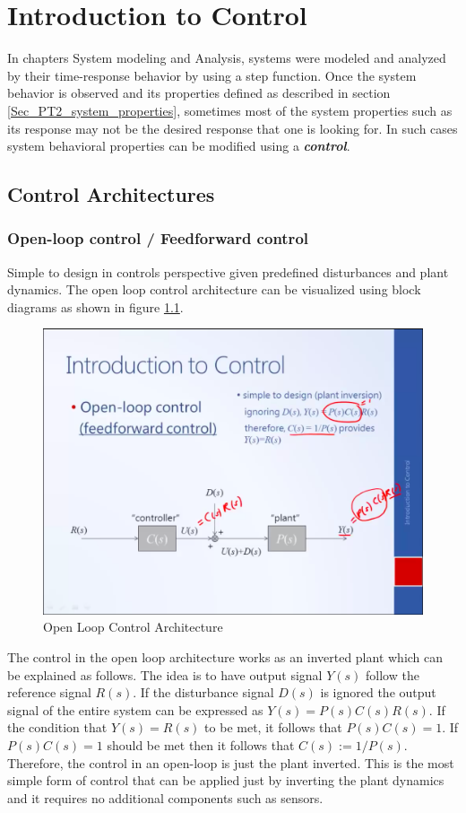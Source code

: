 \chapter{Introduction to Control}

In chapters System modeling and Analysis, systems were modeled and analyzed by their time-response behavior by using a step function. Once the system behavior is observed and its properties defined as described in section \ref{Sec_PT2_system_properties}, sometimes most of the system properties such as its response may not be the desired response that one is looking for. In such cases system behavioral properties can be modified using a \textbf{\textit{control}}.

\section{Control Architectures}

\subsection{Open-loop control / Feedforward control} \label{Sec_OL_ControlArchitecture}

Simple to design in controls perspective given predefined disturbances and plant dynamics. The open loop control architecture can be visualized using block diagrams as shown in figure \ref{fig_OpenLoopControl}.
\begin{figure}[h!]
	\centering
	\includegraphics[width=0.8\linewidth]{Bilder/OpenLoopControl}
	\caption{Open Loop Control Architecture}
	\label{fig_OpenLoopControl}
\end{figure}
\clearpage
The control in the open loop architecture works as an inverted plant which can be explained as follows. The idea is to have output signal $Y(s)$ follow the reference signal $R(s)$. If the disturbance signal $D(s)$ is ignored the output signal of the entire system can be expressed as $Y(s) = P(s)C(s)R(s)$. If the condition that $Y(s) = R(s)$ to be met, it follows that $P(s)C(s) = 1$. If $P(s)C(s) = 1$ should be met then it follows that $C(s) := 1/P(s)$. Therefore, the control in an open-loop is just the plant inverted. This is the most simple form of control that can be applied just by inverting the plant dynamics and it requires no additional components such as sensors.

